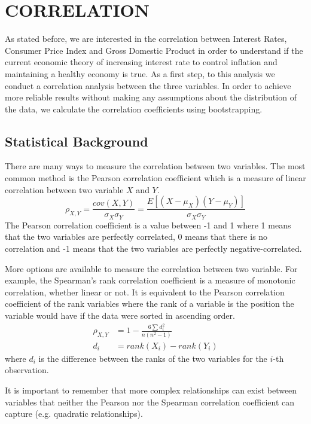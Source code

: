 \section{CORRELATION}
As stated before, we are interested in the correlation between Interest Rates, Consumer Price Index and Gross Domestic Product in order to understand if the current economic theory of increasing interest rate to control inflation and maintaining a healthy economy is true. As a first step, to this analysis we conduct a correlation analysis between the three variables. In order to achieve more reliable results without making any assumptions about the distribution of the data, we calculate the correlation coefficients using bootstrapping.

\subsection*{Statistical Background}
There are many ways to measure the correlation between two variables. The most common method is the Pearson correlation coefficient which is a measure of linear correlation between two variable $X$ and $Y$.
\begin{equation*}
    \rho_{X,Y} = \frac{cov(X,Y)}{\sigma_X \sigma_Y} = \frac{E[(X-\mu_X)(Y-\mu_Y)]}{\sigma_X \sigma_Y}
\end{equation*}
The Pearson correlation coefficient is a value between -1 and 1 where 1 means that the two variables are perfectly correlated, 0 means that there is no correlation and -1 means that the two variables are perfectly negative-correlated.

More options are available to measure the correlation between two variable. For example, the Spearman's rank correlation coefficient is a measure of monotonic correlation, whether linear or not. It is equivalent to the Pearson correlation coefficient of the rank variables where the rank of a variable is the position the variable would have if the data were sorted in ascending order.
\begin{align*}
    \rho_{X,Y} & = 1 - \frac{6 \sum d_i^2}{n(n^2-1)} \\
    d_i        & = rank(X_i) - rank(Y_i)
\end{align*}
where $d_i$ is the difference between the ranks of the two variables for the $i$-th observation.

It is important to remember that more complex relationships can exist between variables that neither the Pearson nor the Spearman correlation coefficient can capture (e.g. quadratic relationships).

